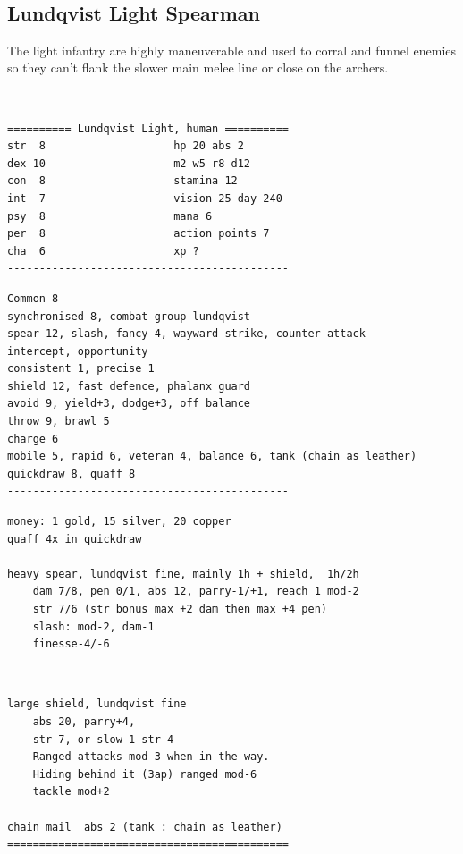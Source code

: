 \


\subsection*{Lundqvist Light Spearman}

The light infantry are highly maneuverable and used to corral and funnel enemies so they can't flank the slower main melee line or close on the archers.

\

\goodbreak \small \begin{samepage} \begin{verbatim}
========== Lundqvist Light, human ==========
str  8                    hp 20 abs 2
dex 10                    m2 w5 r8 d12
con  8                    stamina 12
int  7                    vision 25 day 240
psy  8                    mana 6
per  8                    action points 7
cha  6                    xp ?
--------------------------------------------
\end{verbatim} \goodbreak \begin{verbatim}
Common 8
synchronised 8, combat group lundqvist
spear 12, slash, fancy 4, wayward strike, counter attack
intercept, opportunity
consistent 1, precise 1
shield 12, fast defence, phalanx guard
avoid 9, yield+3, dodge+3, off balance
throw 9, brawl 5
charge 6
mobile 5, rapid 6, veteran 4, balance 6, tank (chain as leather)
quickdraw 8, quaff 8
--------------------------------------------
\end{verbatim} \goodbreak \begin{verbatim}
money: 1 gold, 15 silver, 20 copper
quaff 4x in quickdraw

heavy spear, lundqvist fine, mainly 1h + shield,  1h/2h
    dam 7/8, pen 0/1, abs 12, parry-1/+1, reach 1 mod-2
    str 7/6 (str bonus max +2 dam then max +4 pen)
    slash: mod-2, dam-1
    finesse-4/-6
\end{verbatim} \end{samepage}   \   \goodbreak \begin{samepage} \begin{verbatim}
large shield, lundqvist fine
    abs 20, parry+4,
    str 7, or slow-1 str 4
    Ranged attacks mod-3 when in the way.
    Hiding behind it (3ap) ranged mod-6
    tackle mod+2

chain mail  abs 2 (tank : chain as leather)
============================================
\end{verbatim} \end{samepage} \normalsize

